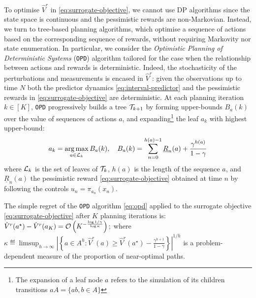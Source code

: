 \documentclass{article}
\begin{document}
To optimise $\hat{V}^r$ in \eqref{eq:surrogate-objective}, we cannot use DP algorithms since the state space is continuous and the pessimistic rewards are non-Markovian. Instead, we turn to tree-based planning algorithms, which optimise a sequence of actions based on the corresponding sequence of rewards, without requiring Markovity nor state enumeration. In particular, we consider the \emph{Optimistic Planning of Deterministic Systems} (\texttt{OPD}) algorithm \citep{Hren2008} tailored for the case when the relationship between actions and rewards is deterministic. Indeed, the stochasticity of the perturbations and measurements is encased in $\hat{V}^r$: given the observations up to time $N$ both the predictor dynamics \eqref{eq:interval-predictor} and the pessimistic rewards in \eqref{eq:surrogate-objective} are deterministic. At each planning iteration $k\in[K]$, \texttt{OPD} progressively builds a tree $\mathcal{T}_{k+1}$ by forming upper-bounds $B_a(k)$ over the value of sequences of actions $a$, and expanding\footnote{The expansion of a leaf node $a$ refers to the simulation of its children transitions $aA = \{ab, b\in A\}$} the leaf $a_k$ with highest upper-bound: 
\begin{equation}
\label{eq:opd}
a_k = \operatorname*{arg\,max}_{a\in\mathcal{L}_k} B_a(k), \quad B_a(k) = \sum_{n=0}^{h(a)-1} \underline{R}_n(a) + \frac{\gamma^{h(a)}}{1-\gamma}
\end{equation}
where $\mathcal{L}_k$ is the set of leaves of $\mathcal{T}_k$, $h(a)$ is the length of the sequence $a$, and $\underline{R}_n(a)$ the pessimistic reward \eqref{eq:surrogate-objective} obtained at time $n$ by following the controls $u_n = \pi_{a_n}(x_n)$.
\begin{theorem}
\label{theorem:opd-regret}
The simple regret of the \texttt{OPD} algorithm \eqref{eq:opd} applied to the surrogate objective \eqref{eq:surrogate-objective} after $K$ planning iterations is:
$
\hat{V}^r(a^{\star}) - \hat{V}^r({a_K}) = \mathcal{O}\left(K^{-\frac{\log 1/\gamma}{\log \kappa}}\right);
$
where $\kappa \eqdef \limsup_{h\rightarrow\infty} \left|\left\{a\in A^h: \hat{V}^r(a)\geq \hat{V}^r(a^{\star}) - \frac{\gamma^{h+1}}{1-\gamma}\right\}\right|^{1/h}$ is a problem-dependent measure of the proportion of near-optimal paths.
\end{theorem}
\end{document}
